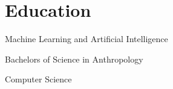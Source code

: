 \documentclass[letterpaper]{resume}
\begin{document}
\section{Education}

\begin{compactitem}[\null]
\item Machine Learning and Artificial Intelligence
\end{compactitem}

\begin{compactitem}[\null]
\item Bachelors of Science in Anthropology
\end{compactitem}

\begin{compactitem}[\null]
\item Computer Science 
\end{compactitem}


\end{document}
